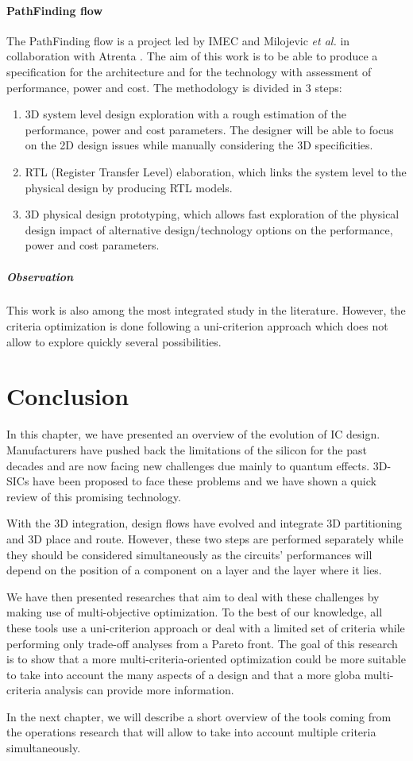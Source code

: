 \paragraph{PathFinding flow}
The PathFinding flow is a project led by IMEC and Milojevic \textit{et al.} in collaboration with Atrenta \cite{5335663,DBLP:conf/3dic/MilojevicCCRRSAPM09}. The aim of this work is to be able to produce a specification for the architecture and for the technology with assessment of performance, power and cost. The methodology is divided in 3 steps:
\begin{enumerate}
\item 3D system level design exploration with a rough estimation of the performance, power and cost parameters. The designer will be able to focus on the 2D design issues while manually considering the 3D specificities.
\item RTL (Register Transfer Level) elaboration, which links the system level to the physical design by producing RTL models.
\item 3D physical design prototyping, which allows fast exploration of the physical design impact of alternative design/technology options on the performance, power and cost parameters.
\end{enumerate}

\subparagraph{Observation}
This work is also among the most integrated study in the literature. However, the criteria optimization is done following a uni-criterion approach which does not allow to explore quickly several possibilities.

\section{Conclusion}
In this chapter, we have presented an overview of the evolution of IC design. Manufacturers have pushed back the limitations of the silicon for the past decades and are now facing new challenges due mainly to quantum effects. 3D-SICs have been proposed to face these problems and we have shown a quick review of this promising technology.

With the 3D integration, design flows have evolved and integrate 3D partitioning and 3D place and route. However, these two steps are performed separately while they should be considered simultaneously as the circuits' performances will depend on the position of a component on a layer and the layer where it lies.

We have then presented researches that aim to deal with these challenges by making use of multi-objective optimization. To the best of our knowledge, all these tools use a uni-criterion approach or deal with a limited set of criteria while performing only trade-off analyses from a Pareto front. The goal of this research is to show that a more multi-criteria-oriented optimization could be more suitable to take into account the many aspects of a design and that a more globa multi-criteria analysis can provide more information.

In the next chapter, we will describe a short overview of the tools coming from the operations research that will allow to take into account multiple criteria simultaneously.